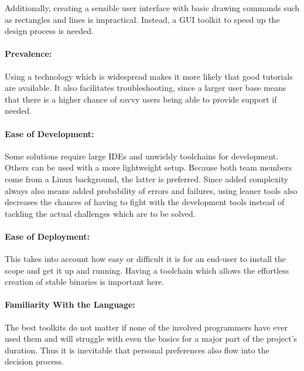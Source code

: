 Additionally, creating a  sensible user interface with  basic drawing commands
such as rectangles  and lines is impractical. Instead, a GUI  toolkit to speed
up the design process is needed.

\paragraph{Prevalence:} Using a  technology which is widespread  makes it more
likely that good tutorials are available. It also facilitates troubleshooting,
since a larger  user base means that  there is a higher chance  of savvy users
being able to provide support if needed.

\paragraph{Ease  of  Development:} Some  solutions   require  large  IDEs  and
unwieldy  toolchains  for   development. Others  can  be  used   with  a  more
lightweight setup. Because  both team  members come  from a  Linux background,
the  latter  is preferred. Since  added  complexity  always also  means  added
probability  of errors  and failures,  using leaner  tools also  decreases the
chances of having to fight with  the development tools instead of tackling the
actual challenges which are to be solved.

\paragraph{Ease of Deployment:} This takes into  account how easy or difficult
it is for an end-user to install the scope and get it up and running. Having a
toolchain which allows the effortless creation of stable binaries is important
here.

\paragraph{Familiarity With the Language:} The best  toolkits do not matter if
none of  the involved programmers have  ever used them and  will struggle with
even  the basics  for  a major  part  of the  project's  duration. Thus it  is
inevitable that personal preferences also flow into the decision process.

